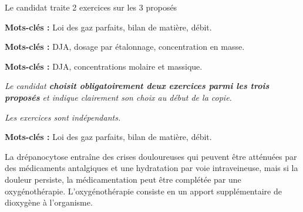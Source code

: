 \newpage
\vAligne{-50pt}

\begin{boite}
  \centering
  Le candidat traite  2 exercices sur les 3 proposés

  \begin{multicols}{3}
    \begin{boite}
      \begin{center}
      \end{center}
      \vspace*{-12pt}
      \textbf{Mots-clés :} Loi des gaz parfaits, bilan de matière, débit.
    \end{boite}
    \begin{boite}
      \begin{center}
      \end{center}
      \vspace*{-12pt}
      \textbf{Mots-clés :} DJA, dosage par étalonnage, concentration en masse.
    \end{boite}
    \begin{boite}
      \begin{center}
      \end{center}
      \vspace*{-12pt}
      \textbf{Mots-clés :} DJA, concentrations molaire et massique.
    \end{boite}
  \end{multicols}
\end{boite}

\textit{
  Le candidat \textbf{choisit obligatoirement deux exercices parmi les trois proposés} et indique clairement son choix au début de la copie.
}
  
\textit{
  Les exercices sont indépendants.
}
\vspace*{24pt}


\vspace*{-4pt}

\textbf{Mots-clés :} Loi des gaz parfaits, bilan de matière, débit.
\medskip


La drépanocytose entraîne des crises douloureuses qui peuvent être atténuées par des médicaments antalgiques et une hydratation par voie intraveineuse, mais si la douleur persiste, la médicamentation peut être complétée par une oxygénothérapie.
L’oxygénothérapie consiste en un apport supplémentaire de dioxygène à l’organisme.

